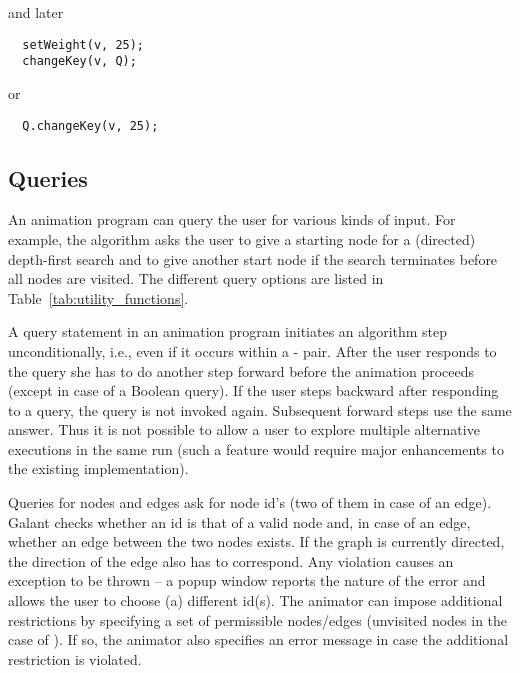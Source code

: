 and later

\begin{minipage}{0.4\textwidth}
\begin{verbatim}
  setWeight(v, 25);
  changeKey(v, Q);
\end{verbatim}
\end{minipage}
or
\begin{minipage}{0.4\textwidth}
\begin{verbatim}
  Q.changeKey(v, 25);
\end{verbatim}
\end{minipage}

\subsection{Queries}

An animation program can query the user for various kinds of input.
For example, the  algorithm asks the user to give a
starting node for a (directed) depth-first search and to give another start
node if the search terminates before all nodes are visited. The different
query options are listed in Table~\ref{tab:utility_functions}.

A query statement in an animation program initiates an algorithm step
unconditionally, i.e., even if it occurs within a
- pair.
After the user responds to the query she has to do another step forward
before the animation proceeds (except in case of a Boolean query).
If the user steps backward after responding to a query, the query is not
invoked again. Subsequent forward steps use the same answer.
Thus it is not possible to allow a user to explore multiple alternative
executions in the same run (such a feature would require major enhancements
to the existing implementation).

Queries for nodes and edges ask for node id's (two of them in case of an
edge). Galant checks whether an id is that of a valid node and, in case of an
edge, whether an edge between the two nodes exists. If the graph is currently
directed, the direction of the edge also has to correspond. Any violation
causes an exception to be thrown -- a popup window reports the nature of the
error and allows the user to choose (a) different id(s).
The animator can impose additional restrictions by specifying a set of
permissible nodes/edges (unvisited nodes in the case of
). If so, the animator also specifies an error message
in case the additional restriction is violated.

